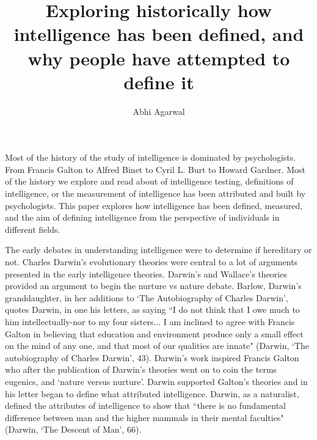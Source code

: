 \documentclass[11pt, oneside]{article}
\title{Exploring historically how intelligence has been defined, and why people have attempted to define it\vspace{-0.4cm}}
\author{Abhi Agarwal\vspace{-1cm}}
\date{}
\begin{document}
\maketitle


\par Most of the history of the study of intelligence is dominated by psychologists. From Francis Galton to Alfred Binet to Cyril L. Burt to Howard Gardner. Most of the history we explore and read about of intelligence testing, definitions of intelligence, or the measurement of intelligence has been attributed and built by psychologists. This paper explores how intelligence has been defined, measured, and the aim of defining intelligence from the perspective of individuals in different fields.


\par 



\par The early debates in understanding intelligence were to determine if hereditary or not. Charles Darwin's evolutionary theories were central to a lot of arguments presented in the early intelligence theories. Darwin's and Wallace's theories provided an argument to begin the nurture vs nature debate. Barlow, Darwin's granddaughter, in her additions to `The Autobiography of Charles Darwin', quotes Darwin, in one his letters, as saying ``I do not think that I owe much to him intellectually-nor to my four sisters... I am inclined to agree with Francis Galton in believing that education and environment produce only a small effect on the mind of any one, and that most of our qualities are innate" (Darwin, `The autobiography of Charles Darwin', 43). Darwin's work inspired Francis Galton who after the publication of Darwin's theories went on to coin the terms eugenics, and `nature versus nurture'. Darwin supported Galton's theories and in his letter began to define what attributed intelligence. Darwin, as a naturalist, defined the attributes of intelligence to show that ``there is no fundamental difference between man and the higher mammals in their mental faculties" (Darwin, `The Descent of Man', 66). 
\end{document}
